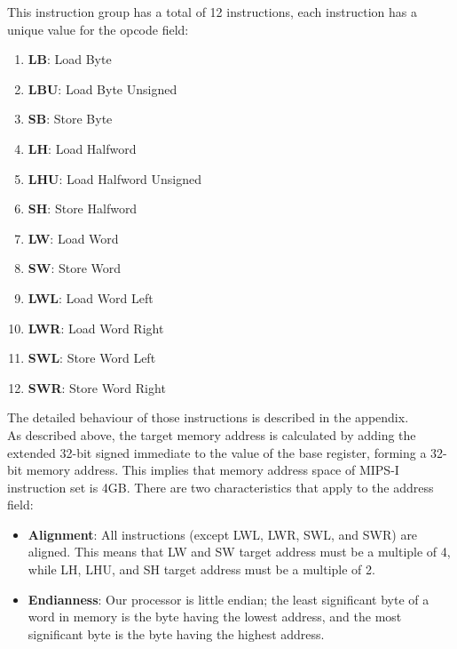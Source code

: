 \documentclass[]{scrartcl}
\begin{document}
This instruction group has a total of 12 instructions, each instruction
has a unique value for the opcode field:

\begin{enumerate}

\item \textbf{LB}:  Load Byte
\item \textbf{LBU}: Load Byte Unsigned
\item \textbf{SB}:  Store Byte
\item \textbf{LH}:  Load Halfword
\item \textbf{LHU}: Load Halfword Unsigned
\item \textbf{SH}:  Store Halfword
\item \textbf{LW}:  Load Word
\item \textbf{SW}:  Store Word
\item \textbf{LWL}: Load Word Left
\item \textbf{LWR}: Load Word Right
\item \textbf{SWL}: Store Word Left
\item \textbf{SWR}: Store Word Right

\end{enumerate}

The detailed behaviour of those instructions is described
in the appendix.\\

As described above, the target memory address is calculated by
adding the extended 32-bit signed immediate to the value of
the base register, forming a 32-bit memory address. This implies
that memory address space of MIPS-I instruction set is 4GB. There
are two characteristics that apply to the address field:

\begin{itemize}

\item \textbf{Alignment}: All instructions (except LWL, LWR, SWL,
                          and SWR) are aligned. This means that
                          LW and SW target address must be
                          a multiple of 4, while LH, LHU, and
                          SH target address must be a multiple of 2.

\item \textbf{Endianness}: Our processor is little endian; the least
                           significant byte of a word in memory is the
                           byte having the lowest address, and the
                           most significant byte is the byte having
                           the highest address.

\end{itemize}
\end{document}
